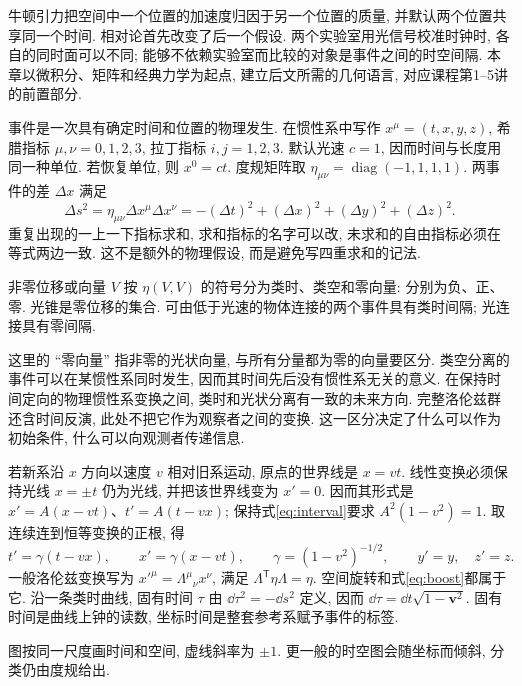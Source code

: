 \label{ch:sr}
牛顿引力把空间中一个位置的加速度归因于另一个位置的质量, 并默认两个位置共享同一个时间. 相对论首先改变了后一个假设. 两个实验室用光信号校准时钟时, 各自的同时面可以不同; 能够不依赖实验室而比较的对象是事件之间的时空间隔. 本章以微积分、矩阵和经典力学为起点, 建立后文所需的几何语言, 对应课程第1--5讲的前置部分.

事件是一次具有确定时间和位置的物理发生. 在惯性系中写作 $x^\mu=(t,x,y,z)$, 希腊指标 $\mu,\nu=0,1,2,3$, 拉丁指标 $i,j=1,2,3$. 默认光速 $c=1$, 因而时间与长度用同一种单位. 若恢复单位, 则 $x^0=ct$. 度规矩阵取 $\eta_{\mu\nu}=\operatorname{diag}(-1,1,1,1)$. 两事件的差 $\Delta x$ 满足
\begin{equation}\label{eq:interval}
\Delta s^2=\eta_{\mu\nu}\Delta x^\mu\Delta x^\nu
=-(\Delta t)^2+(\Delta x)^2+(\Delta y)^2+(\Delta z)^2.
\end{equation}
重复出现的一上一下指标求和, 求和指标的名字可以改, 未求和的自由指标必须在等式两边一致. 这不是额外的物理假设, 而是避免写四重求和的记法.

\begin{definition}
非零位移或向量 $V$ 按 $\eta(V,V)$ 的符号分为类时、类空和零向量: 分别为负、正、零. 光锥是零位移的集合. 可由低于光速的物体连接的两个事件具有类时间隔; 光连接具有零间隔.
\end{definition}
这里的 ``零向量'' 指非零的光状向量, 与所有分量都为零的向量要区分. 类空分离的事件可以在某惯性系同时发生, 因而其时间先后没有惯性系无关的意义. 在保持时间定向的物理惯性系变换之间, 类时和光状分离有一致的未来方向. 完整洛伦兹群还含时间反演, 此处不把它作为观察者之间的变换. 这一区分决定了什么可以作为初始条件, 什么可以向观测者传递信息.

若新系沿 $x$ 方向以速度 $v$ 相对旧系运动, 原点的世界线是 $x=vt$. 线性变换必须保持光线 $x=\pm t$ 仍为光线, 并把该世界线变为 $x'=0$. 因而其形式是 $x'=A(x-vt)$、$t'=A(t-vx)$; 保持式\eqref{eq:interval}要求 $A^2(1-v^2)=1$. 取连续连到恒等变换的正根, 得
\begin{equation}\label{eq:boost}
t'=\gamma(t-vx),\qquad x'=\gamma(x-vt),\qquad
\gamma=(1-v^2)^{-1/2},\qquad y'=y,\quad z'=z.
\end{equation}
一般洛伦兹变换写为 $x'^{\mu}=\Lambda^\mu{}_{\nu}x^\nu$, 满足 $\Lambda^{\mathsf T}\eta\Lambda=\eta$. 空间旋转和式\eqref{eq:boost}都属于它. 沿一条类时曲线, 固有时间 $\tau$ 由 $\dd\tau^2=-\dd s^2$ 定义, 因而 $\dd\tau=\dd t\sqrt{1-\boldsymbol v^2}$. 固有时间是曲线上钟的读数, 坐标时间是整套参考系赋予事件的标签.

\begin{center}
\end{center}
图按同一尺度画时间和空间, 虚线斜率为 $\pm1$. 更一般的时空图会随坐标而倾斜, 分类仍由度规给出.

